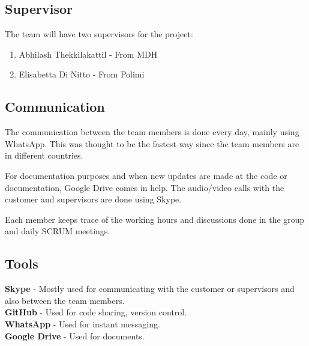 \subsection{Supervisor}
The team will have two supervisors for the project: 
\begin{enumerate}
	\item Abhilash Thekkilakattil - From MDH
	\item Elisabetta Di Nitto - From Polimi
\end{enumerate}
\subsection{Communication}
The communication between the team members is done every day, mainly using WhatsApp. This was thought to be the fastest way since the team members are in different countries.

For documentation purposes and when new updates are made at the code or documentation, Google Drive comes in help. The audio/video calls with the customer and supervisors are done using Skype.

Each member keeps trace of the working hours and discussions done in the group and daily SCRUM meetings.
\subsection{Tools}
\textbf{Skype} - Mostly used for communicating with the customer or supervisors and also between the team members.\\
\textbf{GitHub} - Used for code sharing, version control.\\
\textbf{WhatsApp} - Used for instant messaging.\\
\textbf{Google Drive} - Used for documents.